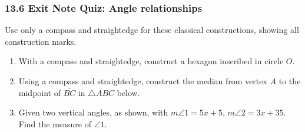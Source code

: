 \documentclass[12pt, twoside]{article}
\begin{document}
\subsubsection*{13.6 Exit Note Quiz: Angle relationships}
Use only a compass and straightedge for these classical constructions, showing all construction marks.
 \begin{enumerate}

 \item With a compass and straightedge, construct a hexagon inscribed in circle $O$.
   \vspace{0.5cm}
   \begin{center}
   \end{center}
      \vspace{1cm}

   \item Using  a  compass  and  straightedge,  construct the median from vertex $A$ to the midpoint of $\overline{BC}$ in $\triangle ABC$ below.
     \vspace{0.5cm}
   \begin{center}
   \end{center}

 \newpage

 \item Given two vertical angles, as shown, with $m \angle 1 = 5x+5$, $m \angle 2 = 3x+35$. Find the measure of $\angle 1$. \vspace{1cm}
   \begin{flushright}
   \end{flushright}
 \vspace{3cm}



\end{enumerate}
\end{document}
